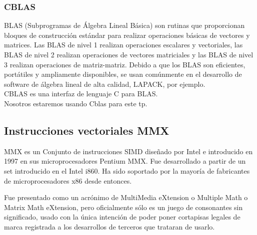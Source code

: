     \subsubsection{CBLAS}
        BLAS (Subprogramas de Álgebra Lineal Básica) son rutinas que proporcionan
        bloques de construcción estándar para realizar operaciones básicas de
        vectores y matrices. Las BLAS de nivel 1 realizan operaciones escalares
        y vectoriales, las BLAS de nivel 2 realizan operaciones de
        vectores matriciales y las BLAS de nivel 3 realizan operaciones
        de matriz-matriz. Debido a que los BLAS son eficientes, portátiles y
        ampliamente disponibles, se usan comúnmente en el desarrollo de software
        de álgebra lineal de alta calidad, LAPACK, por ejemplo.\\
        CBLAS es una interfaz de lenguaje C para BLAS.\\
        Nosotros estaremos usando Cblas para este tp.

\subsection{Instrucciones vectoriales MMX}
    MMX es un Conjunto de instrucciones SIMD diseñado por Intel e introducido en
    1997 en sus microprocesadores Pentium MMX. Fue desarrollado a partir de un
    set introducido en el Intel i860. Ha sido soportado por la mayoría de
    fabricantes de microprocesadores x86 desde entonces.

    Fue presentado como un acrónimo de MultiMedia eXtension o Multiple Math o
    Matrix Math eXtension, pero oficialmente sólo es un juego de consonantes
    sin significado, usado con la única intención de poder poner cortapisas
    legales de marca registrada a los desarrollos de terceros que trataran de
    usarlo.
